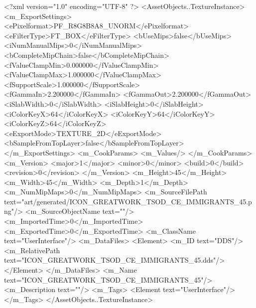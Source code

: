 <?xml version="1.0" encoding="UTF-8" ?>
<AssetObjects..TextureInstance>
	<m_ExportSettings>
		<ePixelformat>PF_R8G8B8A8_UNORM</ePixelformat>
		<eFilterType>FT_BOX</eFilterType>
		<bUseMips>false</bUseMips>
		<iNumManualMips>0</iNumManualMips>
		<bCompleteMipChain>false</bCompleteMipChain>
		<fValueClampMin>0.000000</fValueClampMin>
		<fValueClampMax>1.000000</fValueClampMax>
		<fSupportScale>1.000000</fSupportScale>
		<fGammaIn>2.200000</fGammaIn>
		<fGammaOut>2.200000</fGammaOut>
		<iSlabWidth>0</iSlabWidth>
		<iSlabHeight>0</iSlabHeight>
		<iColorKeyX>64</iColorKeyX>
		<iColorKeyY>64</iColorKeyY>
		<iColorKeyZ>64</iColorKeyZ>
		<eExportMode>TEXTURE_2D</eExportMode>
		<bSampleFromTopLayer>false</bSampleFromTopLayer>
	</m_ExportSettings>
	<m_CookParams>
		<m_Values/>
	</m_CookParams>
	<m_Version>
		<major>1</major>
		<minor>0</minor>
		<build>0</build>
		<revision>0</revision>
	</m_Version>
	<m_Height>45</m_Height>
	<m_Width>45</m_Width>
	<m_Depth>1</m_Depth>
	<m_NumMipMaps>0</m_NumMipMaps>
	<m_SourceFilePath text="art/generated/ICON_GREATWORK_TSOD_CE_IMMIGRANTS_45.png"/>
	<m_SourceObjectName text=""/>
	<m_ImportedTime>0</m_ImportedTime>
	<m_ExportedTime>0</m_ExportedTime>
	<m_ClassName text="UserInterface"/>
	<m_DataFiles>
		<Element>
			<m_ID text="DDS"/>
			<m_RelativePath text="ICON_GREATWORK_TSOD_CE_IMMIGRANTS_45.dds"/>
		</Element>
	</m_DataFiles>
	<m_Name text="ICON_GREATWORK_TSOD_CE_IMMIGRANTS_45"/>
	<m_Description text=""/>
	<m_Tags>
		<Element text="UserInterface"/>
	</m_Tags>
</AssetObjects..TextureInstance>
